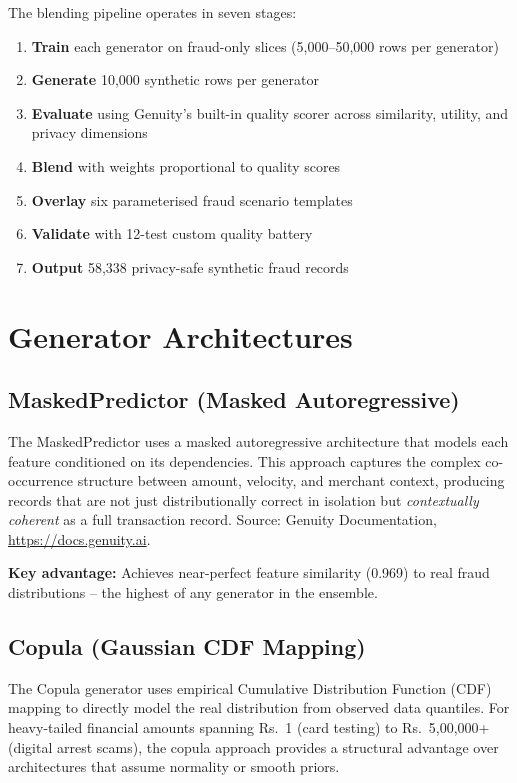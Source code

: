 \documentclass[12pt,a4paper,oneside]{book}
\begin{document}
The blending pipeline operates in seven stages:

\begin{enumerate}
    \item \textbf{Train} each generator on fraud-only slices (5,000--50,000 rows per generator)
    \item \textbf{Generate} 10,000 synthetic rows per generator
    \item \textbf{Evaluate} using Genuity's built-in quality scorer across similarity, utility, and privacy dimensions
    \item \textbf{Blend} with weights proportional to quality scores
    \item \textbf{Overlay} six parameterised fraud scenario templates
    \item \textbf{Validate} with 12-test custom quality battery
    \item \textbf{Output} 58,338 privacy-safe synthetic fraud records
\end{enumerate}

\section{Generator Architectures}

\subsection{MaskedPredictor (Masked Autoregressive)}

The MaskedPredictor uses a masked autoregressive architecture that models each feature conditioned on its dependencies. This approach captures the complex co-occurrence structure between amount, velocity, and merchant context, producing records that are not just distributionally correct in isolation but \emph{contextually coherent} as a full transaction record. Source: Genuity Documentation, \url{https://docs.genuity.ai}.

\textbf{Key advantage:} Achieves near-perfect feature similarity (0.969) to real fraud distributions -- the highest of any generator in the ensemble.

\subsection{Copula (Gaussian CDF Mapping)}

The Copula generator uses empirical Cumulative Distribution Function (CDF) mapping to directly model the real distribution from observed data quantiles. For heavy-tailed financial amounts spanning Rs.\ 1 (card testing) to Rs.\ 5,00,000+ (digital arrest scams), the copula approach provides a structural advantage over architectures that assume normality or smooth priors.
\end{document}

